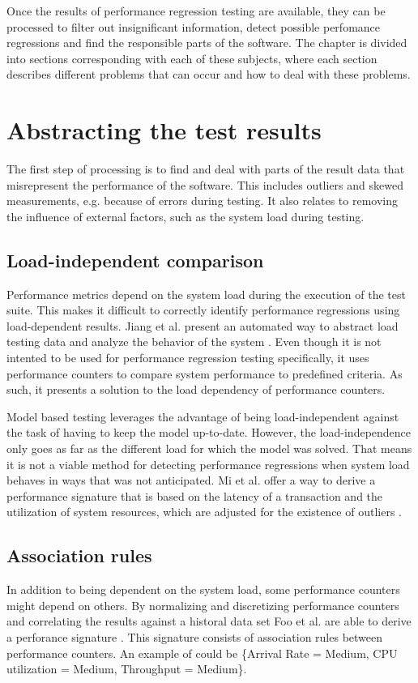 
Once the results of performance regression testing are available, they can be processed to filter out insignificant information, detect possible perfomance regressions and find the responsible parts of the software. The chapter is divided into sections corresponding with each of these subjects, where each section describes different problems that can occur and how to deal with these problems.

\section{Abstracting the test results}
The first step of processing is to find and deal with parts of the result data that misrepresent the performance of the software. This includes outliers and skewed measurements, e.g. because of errors during testing. It also relates to removing the influence of external factors, such as the system load during testing.

\subsection{Load-independent comparison}
Performance metrics depend on the system load during the execution of the test suite. This makes it difficult to correctly identify performance regressions using load-dependent results. Jiang et al. present an automated way to abstract load testing data and analyze the behavior of the system \cite{jiang2010automated}. Even though it is not intented to be used for performance regression testing specifically, it uses performance counters to compare system performance to predefined criteria. As such, it presents a solution to the load dependency of performance counters.

Model based testing leverages the advantage of being load-independent against the task of having to keep the model up-to-date. However, the load-independence only goes as far as the different load for which the model was solved. That means it is not a viable method for detecting performance regressions when system load behaves in ways that was not anticipated. Mi et al. offer a way to derive a performance signature that is based on the latency of a transaction and the utilization of system resources, which are adjusted for the existence of outliers \cite{mi2008analysis}.

\subsection{Association rules}
In addition to being dependent on the system load, some performance counters might depend on others. By normalizing and discretizing performance counters and correlating the results against a historal data set Foo et al. are able to derive a perforance signature \cite{foo2010mining}. This signature consists of association rules between performance counters. An example of could be \{Arrival Rate = Medium, CPU utilization = Medium, Throughput = Medium\}.

